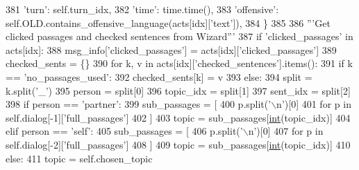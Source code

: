 \begin{DoxyCode}
381                 \textcolor{stringliteral}{'turn'}: self.turn\_idx,
382                 \textcolor{stringliteral}{'time'}: time.time(),
383                 \textcolor{stringliteral}{'offensive'}: self.OLD.contains\_offensive\_language(acts[idx][\textcolor{stringliteral}{'text'}]),
384             \}
385 
386             \textcolor{stringliteral}{'''Get clicked passages and checked sentences from Wizard'''}
387             \textcolor{keywordflow}{if} \textcolor{stringliteral}{'clicked\_passages'} \textcolor{keywordflow}{in} acts[idx]:
388                 msg\_info[\textcolor{stringliteral}{'clicked\_passages'}] = acts[idx][\textcolor{stringliteral}{'clicked\_passages'}]
389                 checked\_sents = \{\}
390                 \textcolor{keywordflow}{for} k, v \textcolor{keywordflow}{in} acts[idx][\textcolor{stringliteral}{'checked\_sentences'}].items():
391                     \textcolor{keywordflow}{if} k == \textcolor{stringliteral}{'no\_passages\_used'}:
392                         checked\_sents[k] = v
393                     \textcolor{keywordflow}{else}:
394                         split = k.split(\textcolor{stringliteral}{'\_'})
395                         person = split[0]
396                         topic\_idx = split[1]
397                         sent\_idx = split[2]
398                         \textcolor{keywordflow}{if} person == \textcolor{stringliteral}{'partner'}:
399                             sub\_passages = [
400                                 p.split(\textcolor{stringliteral}{'\(\backslash\)n'})[0]
401                                 \textcolor{keywordflow}{for} p \textcolor{keywordflow}{in} self.dialog[-1][\textcolor{stringliteral}{'full\_passages'}]
402                             ]
403                             topic = sub\_passages[\hyperlink{namespacelanguage__model_1_1eval__ppl_a7d12ee00479673c5c8d1f6d01faa272a}{int}(topic\_idx)]
404                         \textcolor{keywordflow}{elif} person == \textcolor{stringliteral}{'self'}:
405                             sub\_passages = [
406                                 p.split(\textcolor{stringliteral}{'\(\backslash\)n'})[0]
407                                 \textcolor{keywordflow}{for} p \textcolor{keywordflow}{in} self.dialog[-2][\textcolor{stringliteral}{'full\_passages'}]
408                             ]
409                             topic = sub\_passages[\hyperlink{namespacelanguage__model_1_1eval__ppl_a7d12ee00479673c5c8d1f6d01faa272a}{int}(topic\_idx)]
410                         \textcolor{keywordflow}{else}:
411                             topic = self.chosen\_topic

\end{DoxyCode}
